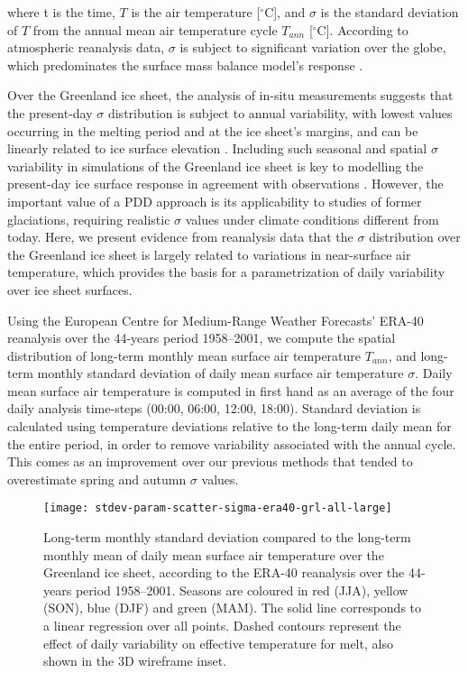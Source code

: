 \documentclass[review]{igs}
\begin{document}
where t is the time, $T$ is the air temperature [$^\circ$C], and $\sigma$ is the standard deviation of $T$ from the annual mean air temperature cycle $T_{ann}$ [$^\circ$C]. According to atmospheric reanalysis data, $\sigma$ is subject to significant variation over the globe, which predominates the surface mass balance model’s response \citep{seguinot-2013}.

Over the Greenland ice sheet, the analysis of in-situ measurements suggests that the present-day $\sigma$ distribution is subject to annual variability, with lowest values occurring in the melting period and at the ice sheet's margins, and can be linearly related to ice surface elevation \citep{fausto-etal-2009,fausto-etal-2011}. Including such seasonal and spatial $\sigma$ variability in simulations of the Greenland ice sheet is key to modelling the present-day ice surface response in agreement with observations \citep{rogozhina-rau-inpress}. However, the important value of a PDD approach is its applicability to studies of former glaciations, requiring realistic $\sigma$ values under climate conditions different from today. Here, we present evidence from reanalysis data that the $\sigma$ distribution over the Greenland ice sheet is largely related to variations in near-surface air temperature, which provides the basis for a parametrization of daily variability over ice sheet surfaces.

Using the European Centre for Medium-Range Weather Forecasts’ ERA-40 reanalysis \citep{uppala-etal-2005} over the 44-years period 1958--2001, we compute the spatial distribution of long-term monthly mean surface air temperature $T_{ann}$, and long-term monthly standard deviation of daily mean surface air temperature $\sigma$. Daily mean surface air temperature is computed in first hand as an average of the four daily analysis time-steps (00:00, 06:00, 12:00, 18:00). Standard deviation is calculated using temperature deviations relative to the long-term daily mean for the entire period, in order to remove variability associated with the annual cycle. This comes as an improvement over our previous methods \citep{seguinot-2013,rogozhina-rau-inpress} that tended to overestimate spring and autumn $\sigma$ values.

\begin{figure*}
    \centering\texttt{[image: stdev-param-scatter-sigma-era40-grl-all-large]}
    \caption{Long-term monthly standard deviation compared to the long-term monthly mean of daily mean surface air temperature over the Greenland ice sheet, according to the ERA-40 reanalysis \citep{uppala-etal-2005} over the 44-years period 1958–2001. Seasons are coloured in red (JJA), yellow (SON), blue (DJF) and green (MAM). The solid line corresponds to a linear regression over all points. Dashed contours represent the effect of daily variability on effective temperature for melt, also shown in the 3D wireframe inset.}
    \label{fig:grl}
\end{figure*}
\end{document}
